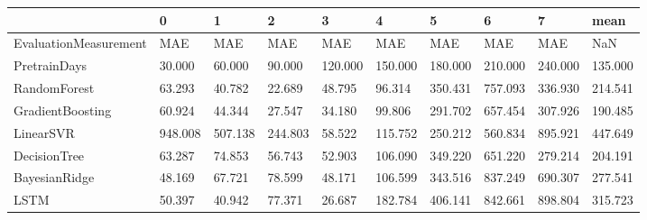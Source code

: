 \begin{tabular}{llllllllll}
\toprule
{} &       0 &       1 &       2 &       3 &       4 &       5 &       6 &       7 &    mean \\
\midrule
EvaluationMeasurement &     MAE &     MAE &     MAE &     MAE &     MAE &     MAE &     MAE &     MAE &     NaN \\
PretrainDays          &  30.000 &  60.000 &  90.000 & 120.000 & 150.000 & 180.000 & 210.000 & 240.000 & 135.000 \\
RandomForest          &  63.293 &  40.782 &  22.689 &  48.795 &  96.314 & 350.431 & 757.093 & 336.930 & 214.541 \\
GradientBoosting      &  60.924 &  44.344 &  27.547 &  34.180 &  99.806 & 291.702 & 657.454 & 307.926 & 190.485 \\
LinearSVR             & 948.008 & 507.138 & 244.803 &  58.522 & 115.752 & 250.212 & 560.834 & 895.921 & 447.649 \\
DecisionTree          &  63.287 &  74.853 &  56.743 &  52.903 & 106.090 & 349.220 & 651.220 & 279.214 & 204.191 \\
BayesianRidge         &  48.169 &  67.721 &  78.599 &  48.171 & 106.599 & 343.516 & 837.249 & 690.307 & 277.541 \\
LSTM                  &  50.397 &  40.942 &  77.371 &  26.687 & 182.784 & 406.141 & 842.661 & 898.804 & 315.723 \\
\bottomrule
\end{tabular}
